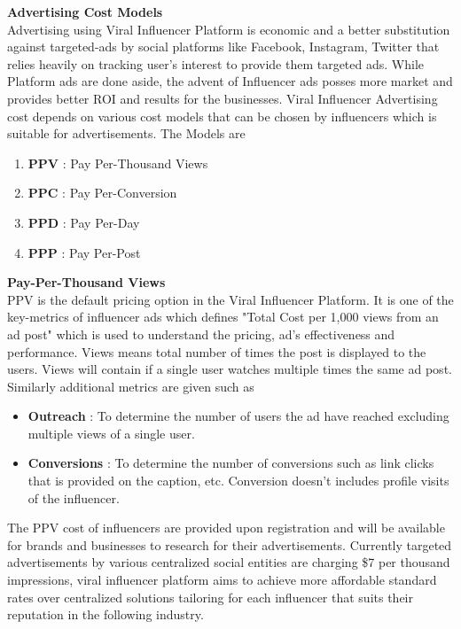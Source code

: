 \documentclass[10pt]{article}
\begin{document}
\textbf{Advertising Cost Models}\\

Advertising using Viral Influencer Platform is economic and a better substitution against targeted-ads by social platforms like Facebook, Instagram, Twitter that relies heavily on tracking user's interest to provide them targeted ads. While Platform ads are done aside, the advent of Influencer ads posses more market and provides better ROI and results for the businesses. Viral Influencer Advertising cost depends on various cost models that can be chosen by influencers which is suitable for advertisements. The Models are
\begin{enumerate}[leftmargin=+0.2in]
\item \textbf{PPV} : Pay Per-Thousand Views
\item \textbf{PPC} : Pay Per-Conversion
\item \textbf{PPD} : Pay Per-Day
\item \textbf{PPP} : Pay Per-Post
\end{enumerate}


\textbf{Pay-Per-Thousand Views}\\

PPV is the default pricing option in the Viral Influencer Platform. It is one of the key-metrics of influencer ads which defines "Total Cost per 1,000 views from an ad post" which is used to understand the pricing, ad's effectiveness and performance. Views means total number of times the post is displayed to the users. Views will contain if a single user watches multiple times the same ad post. Similarly additional metrics are given such as
\begin{itemize}[leftmargin=+0.2in]
\item \textbf{Outreach} : To determine the number of users the ad have reached excluding multiple views of a single user.
\item \textbf{Conversions} : To determine the number of conversions such as link clicks that is provided on the caption, etc. Conversion doesn't includes profile visits of the influencer.
\end{itemize}

The PPV cost of influencers are provided upon registration and will be available for brands and businesses to research for their advertisements. Currently targeted advertisements by various centralized social entities are charging \$7 per thousand impressions, viral influencer platform aims to achieve more affordable standard rates over centralized solutions tailoring for each influencer that suits their reputation in the following industry.\\
\end{document}
